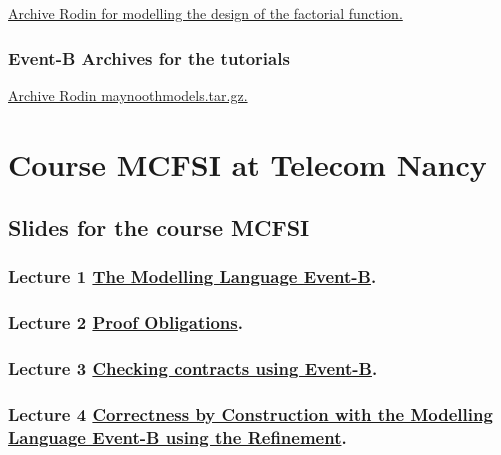 \documentclass[ 12pt]{article}
\begin{document}
  \href{http://mery54.github.io/teaching/mosos/lecturesnotes/factorial-plugin-tutO.zip}{Archive Rodin  for   modelling  the 
   design of the factorial function.}
  


 \subsubsection{Event-B Archives for   the tutorials}
\label{sec:event-b-archives}



\href{http://mery54.github.io/teaching/mosos/models/maynoothmodels.tar.gz}{Archive
  Rodin  maynoothmodels.tar.gz.}




\section{Course MCFSI  at Telecom Nancy}
\label{sec:course-mcfsi-at}


\subsection{Slides for the course MCFSI}
\label{sec:slides}



\subsubsection{Lecture 1
  \href{http://mery54.github.io/teaching/mosos/lecturesnotes/mcfsi-lect1.pdf}{The 
    Modelling Language Event-B}. 
}


\subsubsection{Lecture 2
    \href{http://mery54.github.io/teaching/mosos/lecturesnotes/mcfsi-po.pdf}{Proof
      Obligations}.}


  
\subsubsection{Lecture 3
    \href{http://mery54.github.io/teaching/mosos/lecturesnotes/mcfsi-verification.pdf}{Checking
      contracts using Event-B}.}

  

  \subsubsection{Lecture 4
    \href{http://mery54.github.io/teaching/mosos/lecturesnotes/mcfsi-lect2.pdf}{Correctness by Construction with the  
      Modelling Language Event-B using the Refinement}.}
\label{sec:lect-3-hrefhttp:m}
\end{document}
